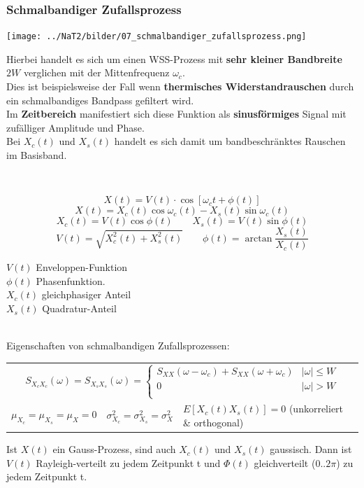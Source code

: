 \subsubsection{Schmalbandiger Zufallsprozess }
\label{schmalbandiger_zufallsprozess}
	\begin{minipage}{9.5cm}
		\texttt{[image: ../NaT2/bilder/07\_schmalbandiger\_zufallsprozess.png]}
  	\end{minipage}
	\begin{minipage}{8.8cm}
		Hierbei handelt es sich um einen WSS-Prozess mit \textbf{sehr kleiner Bandbreite} $2W$ verglichen mit der
		Mittenfrequenz $\omega_c$. \\
		Dies ist beispielsweise der Fall wenn \textbf{thermisches Widerstandrauschen} durch ein schmalbandiges
		Bandpass gefiltert wird. \\
		Im \textbf{Zeitbereich} manifestiert sich diese Funktion als \textbf{sinusförmiges} Signal mit
		zufälliger Amplitude und Phase. \\
		Bei $X_{c}(t)$ und $X_{s}(t)$ handelt es sich damit um bandbeschr\"anktes Rauschen im Basisband.
  	\end{minipage} \\
	\begin{minipage}{10cm}
		\boldmath$$X(t) = V(t) \cdot \cos \left[ \omega_{c}t + \phi(t) \right]$$ \unboldmath
		$$X(t) = X_{c}(t)\cos\omega_{c}(t) - X_{s}(t)\sin\omega_{c}(t)$$
		$$X_{c}(t) = V(t)\cos\phi(t) \qquad X_{s}(t) = V(t)\sin\phi(t)$$
		$$V(t) = \sqrt{X^{2}_{c}(t) + X^{2}_{s}(t)} \qquad \phi(t) = \arctan \frac{X_{s}(t)}{X_{c}(t)}$$
  	\end{minipage}
	\begin{minipage}{8cm}
		$V(t)$ Enveloppen-Funktion \\ 
        $\phi(t)$ Phasenfunktion. \\
		$X_{c}(t)$ gleichphasiger Anteil \\ 
        $X_{s}(t)$ Quadratur-Anteil        
  	\end{minipage} \\

Eigenschaften von schmalbandigen Zufallsprozessen: \\

\renewcommand{\arraystretch}{1.5}
\begin{tabular}{p{4.5cm} p{4.5cm} p{9cm}}
	\multicolumn{3}{c}{$S_{X_{c}X_{c}}(\omega) = 		S_{X_{s}X_{s}}(\omega)
    = \left\lbrace \begin{array}{ll}
      S_{XX}(\omega -\omega_{c}) +S_{XX}(\omega +\omega_{c})
          & \mid\!\omega\!\mid \leq W \\
          0  & \mid\!\omega\!\mid > W \\
                       \end{array} \right. $} \\ 
	$\mu_{X_{c}} = \mu_{X_{s}} = \mu_{X} = 0$
		& $\sigma^{2}_{X_{c}} = \sigma^{2}_{X_{s}} = \sigma^{2}_{X}$
		& $E\left[ X_{c}(t)X_{s}(t) \right]  = 0$ (unkorreliert \& orthogonal) \\
\end{tabular}
\renewcommand{\arraystretch}{1}

Ist $X(t)$ ein Gauss-Prozess, sind auch $X_{c}(t)$ und $X_{s}(t)$ gaussisch. Dann ist $V(t)$
Rayleigh-verteilt zu jedem Zeitpunkt t und $\Phi(t)$ gleichverteilt ($0..2\pi$) zu jedem
Zeitpunkt t. 
